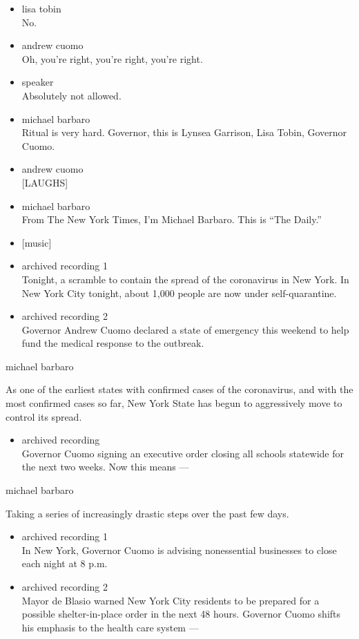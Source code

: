 \begin{itemize}
\item
  lisa tobin\\
  No.
\item
  andrew cuomo\\
  Oh, you're right, you're right, you're right.
\item
  speaker\\
  Absolutely not allowed.
\item
  michael barbaro\\
  Ritual is very hard. Governor, this is Lynsea Garrison, Lisa Tobin,
  Governor Cuomo.
\item
  andrew cuomo\\
  {[}LAUGHS{]}
\item
  michael barbaro\\
  From The New York Times, I'm Michael Barbaro. This is ``The Daily.''
\item
  {[}music{]}
\item
  archived recording 1\\
  Tonight, a scramble to contain the spread of the coronavirus in New
  York. In New York City tonight, about 1,000 people are now under
  self-quarantine.
\item
  archived recording 2\\
  Governor Andrew Cuomo declared a state of emergency this weekend to
  help fund the medical response to the outbreak.
\end{itemize}

michael barbaro

As one of the earliest states with confirmed cases of the coronavirus,
and with the most confirmed cases so far, New York State has begun to
aggressively move to control its spread.

\begin{itemize}
\tightlist
\item
  archived recording\\
  Governor Cuomo signing an executive order closing all schools
  statewide for the next two weeks. Now this means ---
\end{itemize}

michael barbaro

Taking a series of increasingly drastic steps over the past few days.

\begin{itemize}
\item
  archived recording 1\\
  In New York, Governor Cuomo is advising nonessential businesses to
  close each night at 8 p.m.
\item
  archived recording 2\\
  Mayor de Blasio warned New York City residents to be prepared for a
  possible shelter-in-place order in the next 48 hours. Governor Cuomo
  shifts his emphasis to the health care system ---
\end{itemize}

